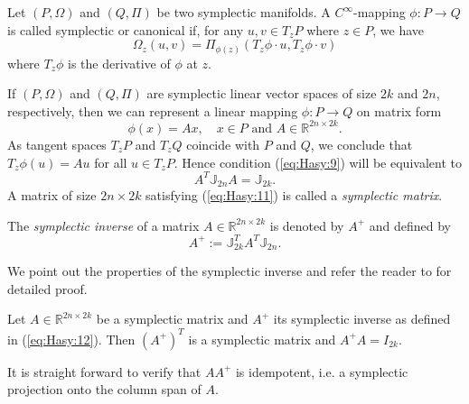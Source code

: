 \begin{definition}
Let $(P,\Omega)$ and $(Q,\Pi)$ be two symplectic manifolds. A $C^\infty$-mapping $\phi:P\to Q$ is called symplectic or canonical if, for any $u,v \in T_zP$ where $z\in P$, we have
\begin{equation} \label{eq:Hasy:9}
	\Omega_z(u,v) = \Pi_{\phi(z)}(T_z\phi\cdot u,T_z \phi \cdot v)
\end{equation}
where $T_z \phi$ is the derivative of $\phi$ at $z$.
\end{definition}

If $(P,\Omega)$ and $(Q,\Pi)$ are symplectic linear vector spaces of size $2k$ and $2n$, respectively, then we can represent a linear mapping $\phi:P\to Q$ on matrix form
\begin{equation} \label{eq:Hasy:10}
	\phi(x) = Ax, \quad x\in P\text{ and }A\in \mathbb{R}^{2n\times 2k}.
\end{equation}
As tangent spaces $T_zP$ and $T_zQ$ coincide with $P$ and $Q$, we conclude that $T_z\phi(u) = Au$ for all $u\in T_zP$. Hence condition (\ref{eq:Hasy:9}) will be equivalent to
\begin{equation} \label{eq:Hasy:11}
	A^T \mathbb{J}_{2n}A = \mathbb{J}_{2k}.
\end{equation}
A matrix of size $2n\times 2k$ satisfying (\ref{eq:Hasy:11}) is called a \emph{symplectic matrix}.

\begin{definition}
	The \emph{symplectic inverse} of a matrix $A\in \mathbb{R}^{2n\times 2k}$ is denoted by $A^+$ and defined by
\begin{equation}\label{eq:Hasy:12}
	A^+ := \mathbb{J}_{2k}^T A^T \mathbb{J}_{2n}.
\end{equation}
\end{definition}
We point out the properties of the symplectic inverse and refer the reader to \cite{Peng:2014di} for detailed proof.
\begin{lemma} \label{lemma:Hasy:1}
Let $A\in \mathbb{R}^{2n\times 2k}$ be a symplectic matrix and $A^+$ its symplectic inverse as defined in (\ref{eq:Hasy:12}). Then ${(A^+)}^T$ is a symplectic matrix and $A^+A = I_{2k}$.
\end{lemma}

It is straight forward to verify that $AA^+$ is idempotent, i.e. a symplectic projection onto the column span of $A$.


